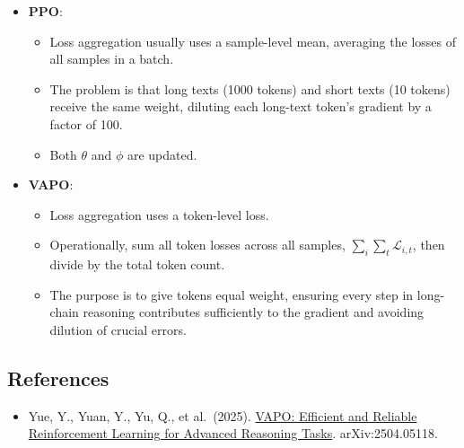 \begin{itemize}
\tightlist
\item
{}
  \textbf{PPO}:

  \begin{itemize}
  \tightlist
  \item
    Loss aggregation usually uses a sample-level mean, averaging the losses of all samples in a batch.
  \item
    The problem is that long texts (1000 tokens) and short texts (10 tokens) receive the same weight, diluting each long-text token's gradient by a factor of 100.
  \item
    Both \(\theta\) and \(\phi\) are updated.
  \end{itemize}
\item
{}
  \textbf{VAPO}:

  \begin{itemize}
  \tightlist
  \item
    Loss aggregation uses a token-level loss.
  \item
    Operationally, sum all token losses across all samples, \(\sum_i\sum_t \mathcal{L}_{i,t}\), then divide by the total token count.
  \item
    The purpose is to give tokens equal weight, ensuring every step in long-chain reasoning contributes sufficiently to the gradient and avoiding dilution of crucial errors.
  \end{itemize}
\end{itemize}

\FloatBarrier
{}
\hypertarget{references-110}{%
\subsection{References}\label{references-110}}

\vspace{0.25em}
\begin{itemize}
\tightlist
\item
  Yue, Y., Yuan, Y., Yu, Q., et al.~(2025). \href{https://arxiv.org/abs/2504.05118}{VAPO: Efficient and Reliable Reinforcement Learning for Advanced Reasoning Tasks}. arXiv:2504.05118.
\end{itemize}

\clearpage
